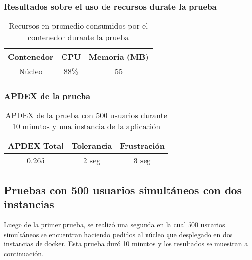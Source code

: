 \subsubsection{Resultados sobre el uso de recursos durate la prueba}
\begin{table}[!htbp]
    \centering
    \makegapedcells
    \begin{tabular}{|c|c|c|}
    \hline
    Contenedor & CPU & Memoria (MB)\\ \hline
    Núcleo & 88\% & 55 \\ \hline
    \end{tabular}
    \caption{Recursos en promedio consumidos por el contenedor durante la prueba}
    \label{tab:tabla_planes}
\end{table}

\subsubsection{APDEX de la prueba}
\begin{table}[!htbp]
    \centering
    \makegapedcells
    \begin{tabular}{|c|c|c|}
    \hline
    APDEX Total & Tolerancia & Frustración\\ \hline
    0.265 & 2 seg & 3 seg \\ \hline
    \end{tabular}
    \caption{APDEX de la prueba con 500 usuarios durante 10 minutos y una instancia de la aplicación}
    \label{tab:tabla_planes}
\end{table}

\subsection{Pruebas con 500 usuarios simultáneos con dos instancias}
Luego de la primer prueba, se realizó una segunda en la cual 500 usuarios simultáneos se encuentran haciendo pedidos al núcleo que desplegado en dos instancias de docker.
Esta prueba duró 10 minutos y los resultados se muestran a continuación.

